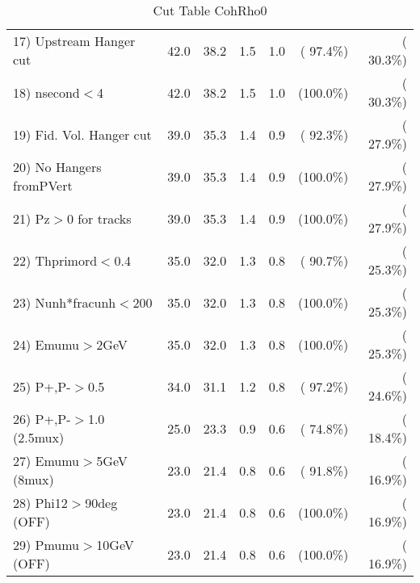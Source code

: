 \begin{table}[h!]
\begin{tabular}{||l||r|r|r|r|r|r||}
 17) Upstream Hanger cut  &         42.0 &         38.2 &          1.5 &          1.0 & ( 97.4\%) & ( 30.3\%) \\
 18) nsecond$<$4          &         42.0 &         38.2 &          1.5 &          1.0 & (100.0\%) & ( 30.3\%) \\
 19) Fid. Vol. Hanger cut &         39.0 &         35.3 &          1.4 &          0.9 & ( 92.3\%) & ( 27.9\%) \\
 20) No Hangers fromPVert &         39.0 &         35.3 &          1.4 &          0.9 & (100.0\%) & ( 27.9\%) \\
 21) Pz$>$0 for tracks    &         39.0 &         35.3 &          1.4 &          0.9 & (100.0\%) & ( 27.9\%) \\
 22) Thprimord$<$0.4      &         35.0 &         32.0 &          1.3 &          0.8 & ( 90.7\%) & ( 25.3\%) \\
 23) Nunh*fracunh$<$200   &         35.0 &         32.0 &          1.3 &          0.8 & (100.0\%) & ( 25.3\%) \\
 24) Emumu$>$2GeV         &         35.0 &         32.0 &          1.3 &          0.8 & (100.0\%) & ( 25.3\%) \\
 25) P+,P-$>$0.5          &         34.0 &         31.1 &          1.2 &          0.8 & ( 97.2\%) & ( 24.6\%) \\
 26) P+,P-$>$1.0 (2.5mux) &         25.0 &         23.3 &          0.9 &          0.6 & ( 74.8\%) & ( 18.4\%) \\
 27) Emumu$>$5GeV  (8mux) &         23.0 &         21.4 &          0.8 &          0.6 & ( 91.8\%) & ( 16.9\%) \\
 28) Phi12$>$90deg  (OFF) &         23.0 &         21.4 &          0.8 &          0.6 & (100.0\%) & ( 16.9\%) \\
 29) Pmumu$>$10GeV  (OFF) &         23.0 &         21.4 &          0.8 &          0.6 & (100.0\%) & ( 16.9\%) \\
 \hline
 \hline
 \end{tabular}
 \caption{Cut Table  CohRho0  }
 \label{tab-cutcohjpsi-mumu_cohrho0}
 \end{table}

